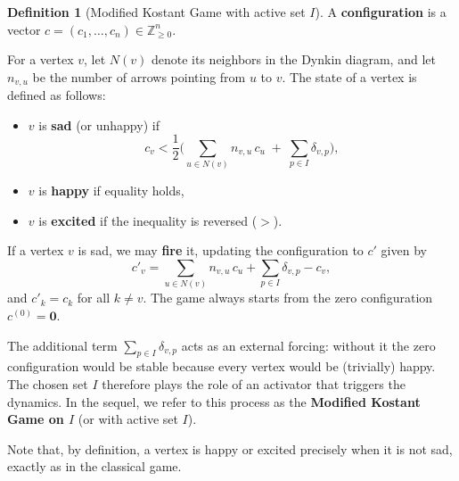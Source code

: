 \documentclass[11pt,a4paper]{amsart}
\theoremstyle{plain}
\theoremstyle{definition}
\newtheorem{definition}[theorem]{Definition}
\theoremstyle{remark}
\begin{document}
\begin{definition}[Modified Kostant Game with active set $I$]
    A \textbf{configuration} is a vector $c = (c_1,\dots,c_n) \in \mathbb{Z}_{\ge 0}^n$.
    
    For a vertex $v$, let $N(v)$ denote its neighbors in the Dynkin diagram, and let $n_{v,u}$ be the number of arrows pointing from $u$ to $v$. The state of a vertex is defined as follows:
    \begin{itemize}
        \item $v$ is \textbf{sad} (or unhappy) if
        \begin{equation}
            c_v < \frac12 \Biggl( \sum_{u \in N(v)} n_{v,u}\,c_u \;+\; \sum_{p \in I} \delta_{v,p} \Biggr),
        \end{equation}
        \item $v$ is \textbf{happy} if equality holds,
        \item $v$ is \textbf{excited} if the inequality is reversed ($>$).
    \end{itemize}
    If a vertex $v$ is sad, we may \textbf{fire} it, updating the configuration to $c'$ given by
    \begin{equation}
        c'_v = \sum_{u \in N(v)} n_{v,u}\,c_u + \sum_{p \in I} \delta_{v,p} - c_v,
    \end{equation}
    and $c'_k = c_k$ for all $k \neq v$. The game always starts from the zero configuration $c^{(0)} = \mathbf{0}$.
\end{definition}

The additional term $\sum_{p\in I}\delta_{v,p}$ acts as an external forcing: without it the zero configuration would be stable because every vertex would be (trivially) happy. The chosen set $I$ therefore plays the role of an activator that triggers the dynamics. In the sequel, we refer to this process as the \textbf{Modified Kostant Game on $I$} (or with active set $I$).

Note that, by definition, a vertex is happy or excited precisely when it is not sad, exactly as in the classical game.
\end{document}
